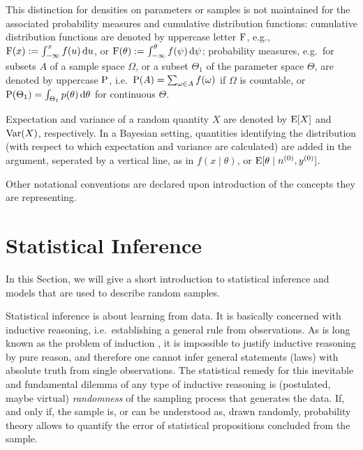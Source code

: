 This distinction for densities on parameters or samples
is not maintained for the associated probability measures and cumulative distribution functions:
cumulative distribution functions are denoted by uppercase letter $\operatorname{F}$,
e.g., $\operatorname{F}(x) := \int_{-\infty}^x f(u) \,\mathrm{d} u$, or $\operatorname{F}(\theta) := \int_{-\infty}^\theta f(\psi) \,\mathrm{d} \psi$;
probability measures, e.g.\ for subsets $A$ of a sample space $\Omega$,
or a subset $\Theta_1$ of the parameter space $\Theta$,
are denoted by uppercase $\operatorname{P}$,
i.e.\ $\operatorname{P}(A) = \sum_{\omega \in A} f(\omega)$ if $\Omega$ is countable,
or $\operatorname{P}(\Theta_1) = \int_{\Theta_1} p(\theta) \,\mathrm{d} \theta$ for continuous $\Theta$.

Expectation and variance of a random quantity $X$ are denoted by $\operatorname{E}[X]$ and $\operatorname{Var}(X)$, respectively.
In a Bayesian setting, quantities identifying the distribution
(with respect to which expectation and variance are calculated)
are added in the argument, seperated by a vertical line, as in $f(x\mid\theta)$, or $\operatorname{E}[\theta\mid n^{(0)}, y^{(0)}]$.

Other notational conventions are declared upon introduction of the concepts they are representing.


\section{Statistical Inference}
\label{sec:stat-inference}


In this Section, we will give a short introduction to statistical inference
and models that are used to describe random samples.

Statistical inference is about learning from data.
It is basically concerned with inductive reasoning,
i.e.\ establishing a general rule from observations.
As is long known as the problem of induction \parencite{1739:hume},
it is impossible to justify inductive reasoning by pure reason,
and therefore one cannot infer general statements (laws) with absolute truth from single observations.
The statistical remedy for this inevitable and fundamental dilemma of any type of inductive reasoning is
(postulated, maybe virtual) \emph{randomness} of the sampling process that generates the data.
If, and only if, the sample is, or can be understood as, drawn randomly,
probability theory allows to quantify the error of statistical propositions concluded from the sample.

